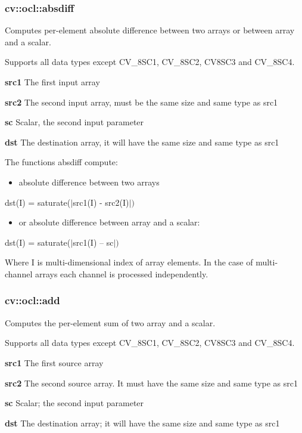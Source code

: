 \documentclass{article}
\begin{document}
\subsubsection{cv::ocl::absdiff}
\label{subsubsec:mylabel4}
Computes per-element absolute difference between two arrays or between array
and a scalar.

Supports all data types except CV{\_}8SC1, CV{\_}8SC2, CV8SC3 and
CV{\_}8SC4.

\textbf{src1 }The first input array

\textbf{src2 }The second input array, must be the same size and same type as
src1

\textbf{sc }Scalar, the second input parameter

\textbf{dst }The destination array, it will have the same size and same type
as src1

The functions absdiff compute:

\begin{itemize}
\item absolute difference between two arrays
\end{itemize}
dst(I) = saturate($\vert $src1(I) - src2(I)$\vert )$

\begin{itemize}
\item or absolute difference between array and a scalar:
\end{itemize}
dst(I) = saturate($\vert $src1(I) -- sc$\vert )$

Where I is multi-dimensional index of array elements. In the case of
multi-channel arrays each channel is processed independently.

\newpage

\subsubsection{cv::ocl::add}
\label{subsubsec:mylabel5}
Computes the per-element sum of two array and a scalar.

Supports all data types except CV{\_}8SC1, CV{\_}8SC2, CV8SC3 and
CV{\_}8SC4.

\textbf{src1} The first source array

\textbf{src2} The second source array. It must have the same size and same
type as src1

\textbf{sc} Scalar; the second input parameter

\textbf{dst } The destination array; it will have the same size and same
type as src1
\end{document}
